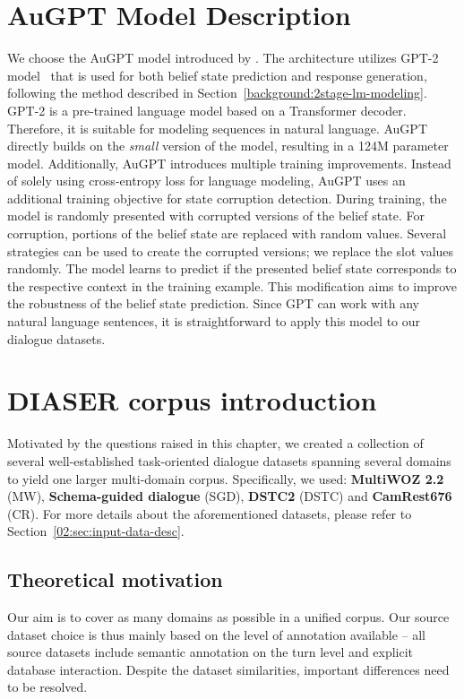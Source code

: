 \section{AuGPT Model Description}
\label{06:augpt}
We choose the AuGPT model introduced by \citet{kulhanek-etal-2021-augpt}.
The architecture utilizes GPT-2 model~\cite{radford2019language} that is used for both belief state prediction and response generation, following the method described in Section~\ref{background:2stage-lm-modeling}.
GPT-2 is a pre-trained language model based on a Transformer decoder.
Therefore, it is suitable for modeling sequences in natural language.
AuGPT directly builds on the \emph{small} version of the model, resulting in a 124M parameter model.
Additionally, AuGPT introduces multiple training improvements.
Instead of solely using cross-entropy loss for language modeling, AuGPT uses an additional training objective for state corruption detection.
During training, the model is randomly presented with corrupted versions of the belief state.
For corruption, portions of the belief state are replaced with random values.
Several strategies can be used to create the corrupted versions; we replace the slot values randomly.
The model learns to predict if the presented belief state corresponds to the respective context in the training example.
This modification aims to improve the robustness of the belief state prediction.
Since GPT can work with any natural language sentences, it is straightforward to apply this model to our dialogue datasets.

\section{DIASER corpus introduction}
\label{06:sec:diaser}
Motivated by the questions raised in this chapter, we created a collection of several well-established task-oriented dialogue datasets spanning several domains to yield one larger multi-domain corpus.
Specifically, we used: \textbf{MultiWOZ 2.2} (MW), \textbf{Schema-guided dialogue} (SGD), \textbf{DSTC2} (DSTC) and \textbf{CamRest676} (CR).
For more details about the aforementioned datasets, please refer to Section~\ref{02:sec:input-data-desc}.

\subsection{Theoretical motivation}
Our aim is to cover as many domains as possible in a unified corpus.
Our source dataset choice is thus mainly based on the level of annotation available -- all source datasets include semantic annotation on the turn level and explicit database interaction. 
Despite the dataset similarities, important differences need to be resolved.


